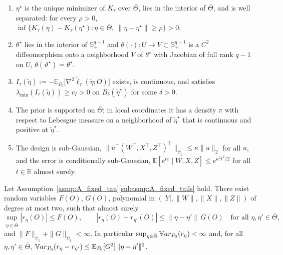 \documentclass[10pt,a4paper]{amsart}
\newcommand{\E}{\mathbb{E}}
\newcommand{\R}{\mathbb{R}}
\newcommand{\Var}{\mathbb{V}{\rm ar}}
\begin{document}
\begin{assumption}
\label{asmp:A_fixed_tau}
\leavevmode
\begin{enumerate}[label=(\roman*),nosep]
\item \label{subasmp:A_fixed_ident}
$\eta^\star$ is the unique minimizer of $K_\tau$ over $\bar\Theta$, lies in the interior of $\bar\Theta$, and is well separated: for every $\rho>0$, $\inf\{K_\tau(\eta)-K_\tau(\eta^\star):\eta\in\bar\Theta,\ \|\eta-\eta^\star\|\ge\rho\}>0$.
\item \label{subasmp:A_fixed_chart}
$\theta^\star$ lies in the interior of $\mathbb S^{q-1}_+$ and $\theta(\cdot):U\to V\subset\mathbb S^{q-1}_+$ is a $C^2$ diffeomorphism onto a neighborhood $V$ of $\theta^\star$ with Jacobian of full rank $q-1$ on $U$, $\theta(\vartheta^\star)=\theta^\star$.
\item \label{subasmp:A_fixed_curv}
$I_\tau(\tilde\eta):=-\E_{P_0}\big[\nabla^2\tilde\ell_\tau(\tilde\eta;O)\big]$ exists, is continuous, and satisfies $\lambda_{\min}(I_\tau(\tilde\eta))\ge c_I>0$ on $B_\delta(\tilde\eta^\star)$ for some $\delta>0$.
\item \label{subasmp:A_fixed_prior}
The prior is supported on $\bar\Theta$; in local coordinates it has a density $\pi$ with respect to Lebesgue measure on a neighborhood of $\tilde\eta^\star$ that is continuous and positive at $\tilde\eta^\star$.
\item \label{subasmp:A_fixed_tails}
The design is sub-Gaussian, $\|u^\top(W^\top,X^\top,Z^\top)^\top\|_{\psi_2}\le\kappa\|u\|_2$ for all $u$, and the error is conditionally sub-Gaussian, $\E[e^{t\varepsilon}\mid W,X,Z]\le e^{\kappa^2t^2/2}$ for all $t\in\R$ almost surely.
\end{enumerate}
\end{assumption}

\begin{lemma}
\label{lem:subexp_fixed_tau_new}
Let Assumption~\ref{asmp:A_fixed_tau}\ref{subasmp:A_fixed_tails} hold. There exist random variables $F(O)$, $G(O)$, polynomial in $(|Y|,\|W\|,\|X\|,\|Z\|)$ of degree at most two, such that almost surely
\[
\sup_{\eta\in\bar\Theta}|r_\eta(O)|\le F(O),\qquad
|r_\eta(O)-r_{\eta'}(O)|\le\|\eta-\eta'\|\,G(O)\quad\text{for all }\eta,\eta'\in\bar\Theta,
\]
and $\|F\|_{\psi_1}+\|G\|_{\psi_1}<\infty$. In particular $\sup_{\eta\in\bar\Theta}\Var_{P_0}(r_\eta)<\infty$ and, for all $\eta,\eta'\in\bar\Theta$,
$\Var_{P_0}(r_\eta-r_{\eta'})\le\E_{P_0}[G^2]\,\|\eta-\eta'\|^2$.
\end{lemma}
\end{document}
